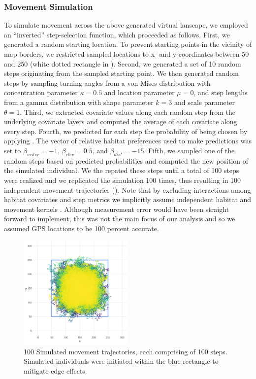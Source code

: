 \documentclass[abstract=on,10pt,a4paper,bibliography=totocnumbered]{article}
\begin{document}
\subsubsection{Movement Simulation}
To simulate movement across the above generated virtual lanscape, we employed an
``inverted'' step-selection function, which proceeded as follows. First, we
generated a random starting location. To prevent starting points in the vicinity
of map borders, we restricted sampled locations to x- and y-coordinates between
50 and 250 (white dotted rectangle in ). Second, we generated a
set of 10 random steps originating from the sampled starting point. We then
generated random steps by sampling turning angles from a von Mises distribution
with concentration parameter \(\kappa = 0.5\) and location parameter \( \mu = 0
\), and step lengths from a gamma distribution with shape parameter \(k = 3 \)
and scale parameter \(\theta = 1\). Third, we extracted covariate values along
each random step from the underlying covariate layers and computed the average
of each covariate along every step. Fourth, we predicted for each step the
probability of being chosen by applying . The vector of relative
habitat preferences used to make predictions was set to \(\beta_{water} = -1\),
\(\beta_{elev} = 0.5\), and \(\beta_{dist} = -15\). Fifth, we sampled one of the
random steps based on predicted probabilities and computed the new position of
the simulated individual. We the repated these steps until a total of 100 steps
were realized and we replicated the simulation 100 times, thus resulting in 100
independent movement trajectories (). Note that by excluding
interactions among habitat covariates and step metrics we implicitly assume
independent habitat and movement kernels \citep{Avgar.2016}. Although
measurement error would have been straight forward to implement, this was not
the main focus of our analysis and so we assumed GPS locations to be 100 percent
accurate.

\begin{figure}
  \begin{center}
  \includegraphics[width = 0.5\textwidth]{99_Simulations.png}
  \caption{100 Simulated movement trajectories, each comprising of 100 steps.
  Simulated individuals were initiated within the blue rectangle to mitigate
  edge effects.}
  \label{Simulations}
  \end{center}
\end{figure}
\end{document}
